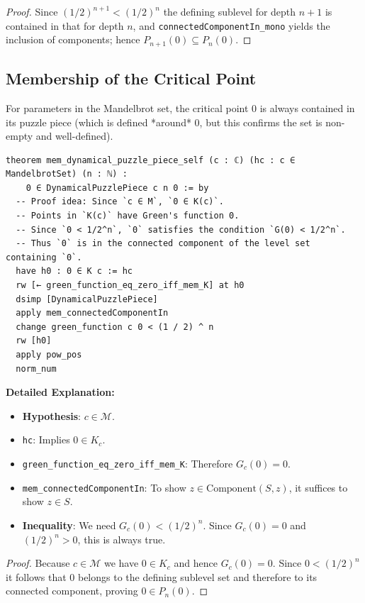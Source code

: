 \begin{proof}
Since $(1/2)^{n+1}<(1/2)^n$ the defining sublevel for depth $n+1$ is contained in that for depth $n$, and \texttt{connectedComponentIn\_mono} yields the inclusion of components; hence $P_{n+1}(0)\subseteq P_n(0)$.
\end{proof}

\subsection{Membership of the Critical Point}

For parameters in the Mandelbrot set, the critical point 0 is always contained in its puzzle piece (which is defined *around* 0, but this confirms the set is non-empty and well-defined).

\begin{lstlisting}[language=Lean]
theorem mem_dynamical_puzzle_piece_self (c : ℂ) (hc : c ∈ MandelbrotSet) (n : ℕ) :
    0 ∈ DynamicalPuzzlePiece c n 0 := by
  -- Proof idea: Since `c ∈ M`, `0 ∈ K(c)`.
  -- Points in `K(c)` have Green's function 0.
  -- Since `0 < 1/2^n`, `0` satisfies the condition `G(0) < 1/2^n`.
  -- Thus `0` is in the connected component of the level set containing `0`.
  have h0 : 0 ∈ K c := hc
  rw [← green_function_eq_zero_iff_mem_K] at h0
  dsimp [DynamicalPuzzlePiece]
  apply mem_connectedComponentIn
  change green_function c 0 < (1 / 2) ^ n
  rw [h0]
  apply pow_pos
  norm_num
\end{lstlisting}

\noindent
\textbf{Detailed Explanation:}
\begin{itemize}
    \item \textbf{Hypothesis}: $c \in \mathcal{M}$.
    \item \texttt{hc}: Implies $0 \in K_c$.
    \item \texttt{green\_function\_eq\_zero\_iff\_mem\_K}: Therefore $G_c(0) = 0$.
    \item \texttt{mem\_connectedComponentIn}: To show $z \in \text{Component}(S, z)$, it suffices to show $z \in S$.
    \item \textbf{Inequality}: We need $G_c(0) < (1/2)^n$. Since $G_c(0)=0$ and $(1/2)^n > 0$, this is always true.
\end{itemize}

\begin{proof}
Because $c\in\mathcal{M}$ we have $0\in K_c$ and hence $G_c(0)=0$. Since $0<(1/2)^n$ it follows that $0$ belongs to the defining sublevel set and therefore to its connected component, proving $0\in P_n(0)$.
\end{proof}

